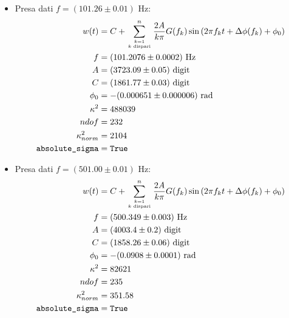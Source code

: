 \documentclass{article}[a4paper, oneside,11pt]
\begin{document}
    \begin{itemize}
        \item Presa dati $f=(101.26\pm0.01)$ Hz:
        \begin{align*}
            w(t) &= C + \sum_{{k=1}\atop{k \text{ dispari}}}^n \frac{2A}{k\pi} G(f_k) \sin\left(2\pi f_k t + \Delta\phi(f_k) + \phi_0\right)\\
            f &=  (101.2076 \pm 0.0002) \text{ Hz}\\
            A &=  (3723.09 \pm 0.05) \text{ digit} \\
            C &=  (1861.77 \pm 0.03) \text{ digit}\\
            \phi_0 &=  -(0.000651 \pm 0.000006) \text{ rad} \\
            \kappa^2 &=  488039 \\
            ndof &=  232 \\
            \kappa^2_{norm} &= 2104 \\
            \texttt{absolute\_sigma} &= \texttt{True}
        \end{align*}
            
        \item Presa dati $f=(501.00\pm0.01)$ Hz:
        \begin{align*}
            w(t) &= C + \sum_{{k=1}\atop{k \text{ dispari}}}^n \frac{2A}{k\pi} G(f_k) \sin\left(2\pi f_k t + \Delta\phi(f_k) + \phi_0\right)\\
            f &=  (500.349 \pm 0.003) \text{ Hz} \\
            A &=  (4003.4 \pm 0.2)\text{ digit} \\
            C &=  (1858.26 \pm 0.06) \text{ digit} \\
            \phi_0 &=  -(0.0908 \pm 0.0001) \text{ rad} \\
            \kappa^2 &=  82621\\
            ndof &=  235 \\
            \kappa^2_{norm} &= 351.58\\
            \texttt{absolute\_sigma} &= \texttt{True}
        \end{align*}
        

\end{itemize}
\end{document}
